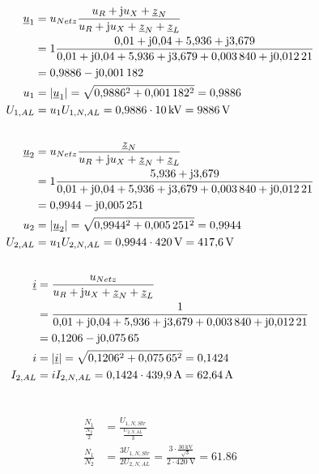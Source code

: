 \documentclass[11pt,a4paper]{scrartcl}
\DeclarePairedDelimiter{\abs}{\lvert}{\rvert}
\renewcommand{\j}{\mathrm{j}}
\newcommand{\z}{\underline{z}}
\renewcommand{\u}{\underline{u}}
\renewcommand{\i}{\underline{i}}
\newcommand{\0}{_{\mybr{0}}}
\newcommand{\1}{_{\mybr{1}}}
\newcommand{\2}{_{\mybr{2}}}
\newcommand{\UPA}{U_{1,AL}}
\newcommand{\USA}{U_{2,AL}}
\newcommand{\ISA}{I_{2,AL}}
\newcommand{\UPNS}{U_{1,N,Str}}
\newcommand{\UPNA}{U_{1,N,AL}}
\newcommand{\USNA}{U_{2,N,AL}}
\newcommand{\ISNA}{I_{2,N,AL}}
\begin{document}
\subsection{}
\begin{align}
\u_1&=u_{Netz}\frac{u_R+\j u_X+\z_N}{u_R+\j u_X+\z_N+\z_L}\\
&=1\frac{\num{0.01}+\j\num{0.04}+\num{5.936}+\j\num{3.679}}{\num{0.01}+\j\num{0.04}+\num{5.936}+\j\num{3.679}+\num{0.003840}+\j\num{0.01221}}\\
&=\num{0.9886}-\j\num{0.001182}\\
u_1&=\abs{\u_1}=\sqrt{\num{0.9886}^2+\num{0.001182}^2}=\num{0.9886}\\
\UPA&=u_1\UPNA=\num{0.9886}\cdot\SI{10}{\kilo\volt}=\SI{9886}{\volt}
\end{align}

\subsection{}
\begin{align}
\u_2&=u_{Netz}\frac{\z_N}{u_R+\j u_X+\z_N+\z_L}\\
&=1\frac{\num{5.936}+\j\num{3.679}}{\num{0.01}+\j\num{0.04}+\num{5.936}+\j\num{3.679}+\num{0.003840}+\j\num{0.01221}}\\
&=\num{0.9944}-\j\num{0.005251}\\
u_2&=\abs{\u_2}=\sqrt{\num{0.9944}^2+\num{0.005251}^2}=\num{0.9944}\\
\USA&=u_1\USNA=\num{0.9944}\cdot\SI{420}{\volt}=\SI{417.6}{\volt}
\end{align}

\subsection{}
\begin{align}
\i&=\frac{u_{Netz}}{u_R+\j u_X+\z_N+\z_L}\\
&=\frac{1}{\num{0.01}+\j\num{0.04}+\num{5.936}+\j\num{3.679}+\num{0.003840}+\j\num{0.01221}}\\
&=\num{0.1206}-\j\num{0.07565}\\
i&=\abs{\i}=\sqrt{\num{0.1206}^2+\num{0.07565}^2}=\num{0.1424}\\
\ISA&=i\ISNA=\num{0.1424}\cdot\SI{439.9}{\ampere}=\SI{62.64}{\ampere}
\end{align}

\section{}
\begin{align}
\frac{N_1}{\frac{N_2}{2}}&=\frac{\UPNS}{\frac{\USNA}{3}}\\
\frac{N_1}{N_2}&=\frac{3\UPNS}{2\USNA}=\frac{3\cdot\frac{\SI{30}{\kilo\volt}}{\sqrt{3}}}{2\cdot\SI{420}{\volt}}=\num{61.86}
\end{align}
\end{document}
